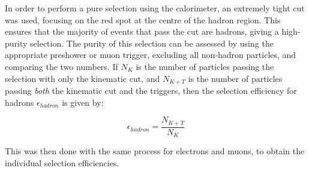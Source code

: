 In order to perform a pure selection using the calorimeter, an extremely tight cut was used, focusing on the red spot at the centre of the hadron region. This ensures that the majority of events that pass the cut are hadrons, giving a high-purity selection. The purity of this selection can be assessed by using the appropriate preshower or muon trigger, excluding all non-hadron particles, and comparing the two numbers. If $N_{K}$ is the number of particles passing the selection with only the kinematic cut, and $N_{K+T}$ is the number of particles passing \emph{both} the kinematic cut and the triggers, then the selection efficiency for hadrons $\epsilon_{hadron}$ is given by:

\begin{displaymath}
	\epsilon_{hadron} = \frac{N_{K+T}}{N_{K}}
\end{displaymath}

This was then done with the same process for electrons and muons, to obtain the individual selection efficiencies. %

